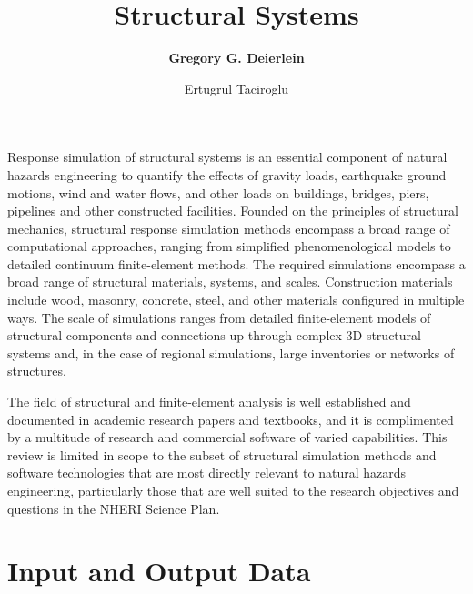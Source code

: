 %
%
%


\title{Structural Systems}
\author{
    \textbf{Gregory G. Deierlein} 
    \and Ertugrul Taciroglu}
\tocauthor{}
%
%
\maketitle

Response simulation of structural systems is an essential component of natural hazards engineering to quantify the effects of gravity loads, earthquake ground motions, wind and water flows, and other loads on buildings, bridges, piers, pipelines and other constructed facilities. Founded on the principles of structural mechanics, structural response simulation methods encompass a broad range of computational approaches, ranging from simplified phenomenological models to detailed continuum finite-element methods. The required simulations encompass a broad range of structural materials, systems, and scales. Construction materials include wood, masonry, concrete, steel, and other materials configured in multiple ways. The scale of simulations ranges from detailed finite-element models of structural components and connections up through complex 3D structural systems and, in the case of regional simulations, large inventories or networks of structures.

The field of structural and finite-element analysis is well established and documented in academic research papers and textbooks, and it is complimented by a multitude of research and commercial software of varied capabilities. This review is limited in scope to the subset of structural simulation methods and software technologies that are most directly relevant to natural hazards engineering, particularly those that are well suited to the research objectives and questions in the NHERI Science Plan. 

\section{Input and Output Data}
\label{sec:resp_struct_io}

